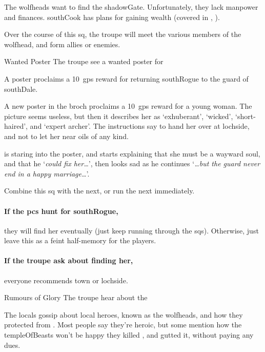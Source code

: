 \label{wolfHeads}

\noindent
The \glspl{wolfhead} want to find the \gls{shadowGate}.
Unfortunately, they lack manpower and finances.
\Gls{southCook} has plans for gaining wealth (covered in , ).

Over the course of this \gls{sq}, the troupe will meet the various members of the \gls{wolfhead}, and form allies or enemies.

{Wanted Poster}%
{The troupe see a wanted poster for }%

A poster proclaims a 10~\glspl{gp} reward for returning \gls{southRogue} to the \gls{guard} of \gls{southDale}.

\begin{boxtext}
  A new poster in the \gls{broch} proclaims a 10~\glspl{gp} reward for a young woman.
  The picture seems useless, but then it describes her as `exhuberant', `wicked', `short-haired', and `expert archer'.
  The instructions say to hand her over at \gls{lochside}, and not to let her near oils of any kind.

   is staring into the poster, and starts explaining that she must be a wayward soul, and that he `\textit{could fix her\ldots}', then looks sad as he continues `\textit{\ldots but the \gls{guard} never end in a happy marriage\ldots}'.
\end{boxtext}

Combine this \gls{sq} with the next, or run the next immediately.

\paragraph{If the \glspl{pc} hunt for \gls{southRogue},}
they will find her eventually (just keep running through the \glspl{sq}).
Otherwise, just leave this as a feint half-memory for the players.

\paragraph{If the troupe ask about finding her,}
everyone recommends \gls{town} or \gls{lochside}.

{Rumours of Glory}%
{The troupe hear about the }%

The locals gossip about local heroes, known as the \glspl{wolfhead}, and how they protected  from .
Most people say they're heroic, but some mention how the \gls{templeOfBeasts} won't be happy they killed , and gutted it, without paying any dues.

